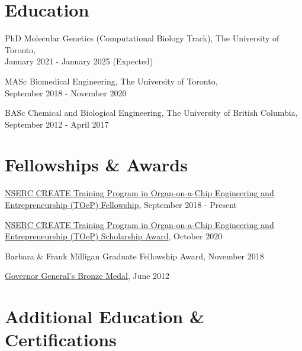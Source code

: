 \documentclass[letterpaper]{article}
\renewenvironment{itemize}{
  \begin{list}{}{
    \setlength{\leftmargin}{1.5em}
  }
}{
  \end{list}
}
\begin{document}
\section*{\textbf{Education}}

\begin{itemize}

\item PhD Molecular Genetics (Computational Biology Track), The University of Toronto,\\
January 2021 - January 2025 (Expected)

\item MASc Biomedical Engineering, The University of Toronto,\\
September 2018 - November 2020
\end{itemize}

\begin{itemize}
  \item BASc Chemical and Biological Engineering, The University of British Columbia,\\
  September 2012 - April 2017
\end{itemize}

\section*{\textbf{Fellowships \& Awards}}
\begin{itemize}
    \item  \href{http://toep.utoronto.ca/}{NSERC CREATE Training Program in Organ-on-a-Chip Engineering and Entrepreneurship (TOeP) Fellowship}, September 2018 - Present
    \item \href{http://toep.utoronto.ca/}{NSERC CREATE Training Program in Organ-on-a-Chip Engineering and Entrepreneurship (TOeP) Scholarship Award}, October 2020
    \item Barbara \& Frank Milligan Graduate Fellowship Award, November 2018
    \item \href{https://www.gg.ca/en/honours/recipients/116-80953}{Governor General's Bronze Medal}, June 2012
\end{itemize}

\section*{\textbf{Additional Education \& Certifications}}
\end{document}
